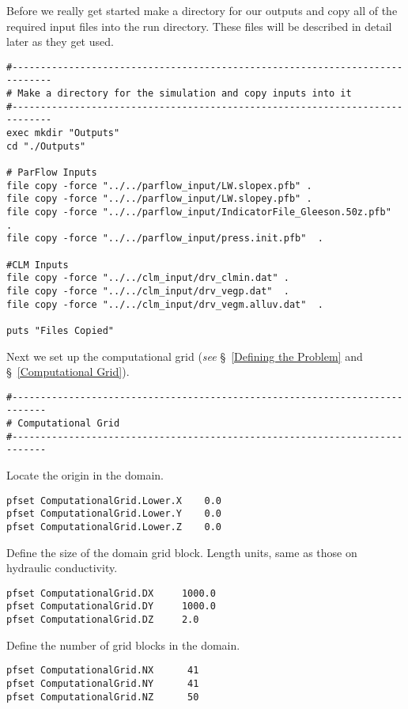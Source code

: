 Before we really get started make a directory for our outputs and copy all of the required input files into the run directory. 
These files will be described in detail later as they get used.

\begin{verbatim}
#-----------------------------------------------------------------------------
# Make a directory for the simulation and copy inputs into it
#-----------------------------------------------------------------------------
exec mkdir "Outputs"
cd "./Outputs"

# ParFlow Inputs
file copy -force "../../parflow_input/LW.slopex.pfb" .
file copy -force "../../parflow_input/LW.slopey.pfb" .
file copy -force "../../parflow_input/IndicatorFile_Gleeson.50z.pfb"   .
file copy -force "../../parflow_input/press.init.pfb"  .

#CLM Inputs
file copy -force "../../clm_input/drv_clmin.dat" .
file copy -force "../../clm_input/drv_vegp.dat"  .
file copy -force "../../clm_input/drv_vegm.alluv.dat"  . 

puts "Files Copied"
\end{verbatim}

Next we set up the computational grid (\emph{see} \S~\ref{Defining the Problem} and  \S~\ref{Computational Grid}).

\begin{verbatim}
#----------------------------------------------------------------------------
# Computational Grid
#----------------------------------------------------------------------------
\end{verbatim}

Locate the origin in the domain.

\begin{verbatim}
pfset ComputationalGrid.Lower.X    0.0
pfset ComputationalGrid.Lower.Y    0.0
pfset ComputationalGrid.Lower.Z    0.0
\end{verbatim}

Define the size of the domain grid block.  Length units, same as those on hydraulic conductivity.

\begin{verbatim}
pfset ComputationalGrid.DX     1000.0
pfset ComputationalGrid.DY     1000.0
pfset ComputationalGrid.DZ     2.0
\end{verbatim}

Define the number of grid blocks in the domain.

\begin{verbatim}
pfset ComputationalGrid.NX      41
pfset ComputationalGrid.NY      41
pfset ComputationalGrid.NZ      50
\end{verbatim}


